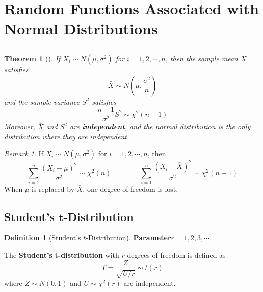 \documentclass[10pt,UTF8]{article}
\newenvironment{definition box}
{\begin{tcolorbox}[colback=blue!5!white,colframe=blue!75!black,parbox=false,before upper=\par,before lower=\par]}
{\end{tcolorbox}}
\newenvironment{theorem box}
{\begin{tcolorbox}[colback=yellow!5!white,colframe=yellow!75!black,parbox=false,before upper=\par,before lower=\par]}
{\end{tcolorbox}}
\theoremstyle{definition}
\newtheorem{definition inner}{Definition}[section]
\newenvironment{definition}[1][]
{\begin{definition box}\begin{definition inner}[#1]\hfill\par}
{\end{definition inner}\end{definition box}}
\theoremstyle{plain}
\newtheorem{theorem inner}{Theorem}[section]
\newenvironment{theorem}[1][]
{\begin{theorem box}\begin{theorem inner}[#1]\hfill\par}
{\end{theorem inner}\end{theorem box}}
\theoremstyle{definition}
\newtheorem*{proof inner}{\textit{Proof}}
\theoremstyle{remark}
\newtheorem*{remark}{\textit{Remark}}
\begin{document}
\section{Random Functions Associated with Normal Distributions}

\subsection{}

\begin{theorem}
    If $X_i\sim N(\mu,\sigma^2)$ for $i=1,2,\cdots,n$,
    then the sample mean $\bar{X}$ satisfies
    \begin{equation*}
        \bar{X} \sim N\left(\mu, \frac{\sigma^2}{n}\right)
    \end{equation*}
    and the sample variance $S^2$ satisfies
    \begin{equation*}
        \frac{n-1}{\sigma^2}S^2 \sim \chi^2(n-1)
    \end{equation*}
    Moreover, $\bar{X}$ and $S^2$ are \textbf{independent},
    and the normal distribution is the only distribution where they are independent.
\end{theorem}

\begin{remark}
    If $X_i\sim N(\mu,\sigma^2)$ for $i=1,2,\cdots,n$, then
    \begin{equation*}
        \sum_{i=1}^n \frac{(X_i - \mu)^2}{\sigma^2} \sim \chi^2(n)
        \qquad\qquad
        \sum_{i=1}^n \frac{(X_i - \bar{X})^2}{\sigma^2} \sim \chi^2(n-1)
    \end{equation*}
    When $\mu$ is replaced by $\bar{X}$,
    one degree of freedom is lost.
\end{remark}

\subsection{Student's \texorpdfstring{$\bm{t}$}{t}-Distribution}

\begin{definition}[Student's $t$-Distribution]
    \textbf{Parameter}\qquad $r=1,2,3,\cdots$

    The \textbf{Student's} $\bm{t}$\textbf{-distribution}
    with $r$ degrees of freedom is defined as
    \begin{equation*}
        T = \frac{Z}{\sqrt{U/r}} \sim t(r)
    \end{equation*}
    where $Z\sim N(0,1)$ and $U\sim \chi^2(r)$ are independent.
\end{definition}
\end{document}
